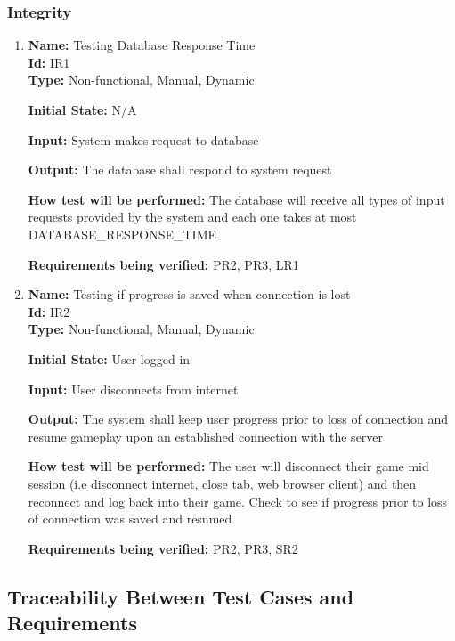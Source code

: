 \documentclass[12pt, titlepage]{article}
\begin{document}
\subsubsection{Integrity}
\begin{enumerate}
  
    
    \item{\textbf{Name:} Testing Database Response Time \\} \label{Test-IR1}
    \textbf{Id:} IR1 \\
    
    \textbf{Type:} Non-functional, Manual, Dynamic
    					
    \textbf{Initial State:} N/A
    					
    \textbf{Input:} System makes request to database
    					
    \textbf{Output:} The database shall respond to system request
    					
    \textbf{How test will be performed:} The database will receive all types of input requests provided by the system and each one takes at most DATABASE\_RESPONSE\_TIME
    
    \textbf{Requirements being verified:} PR2, PR3, LR1
    
    \item{\textbf{Name:} Testing if progress is saved when connection is lost \\} \label{Test-IR2}
    \textbf{Id:} IR2 \\
    
    \textbf{Type:} Non-functional, Manual, Dynamic
    					
    \textbf{Initial State:} User logged in
    					
    \textbf{Input:} User disconnects from internet
    					
    \textbf{Output:} The system shall keep user progress prior to loss of connection and resume gameplay upon an established connection with the server
    					
    \textbf{How test will be performed:} The user will disconnect their game mid session (i.e disconnect internet, close tab, web browser client) and then reconnect and log back into their game. Check to see if progress prior to loss of connection was saved and resumed
    
    \textbf{Requirements being verified:} PR2, PR3, SR2
\end{enumerate}

\subsection{Traceability Between Test Cases and Requirements}
\end{document}
